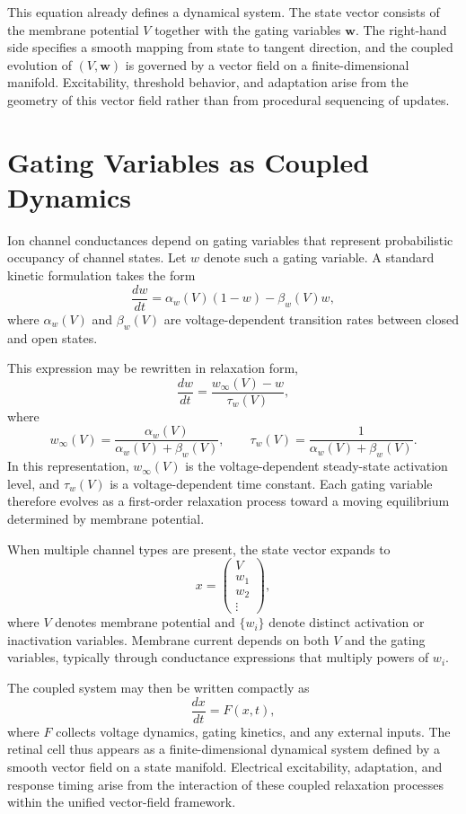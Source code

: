 \documentclass[12pt]{book}
\begin{document}
This equation already defines a dynamical system. The state vector
consists of the membrane potential $V$ together with the gating
variables $\mathbf{w}$. The right-hand side specifies a smooth
mapping from state to tangent direction, and the coupled evolution
of $(V,\mathbf{w})$ is governed by a vector field on a
finite-dimensional manifold. Excitability, threshold behavior,
and adaptation arise from the geometry of this vector field rather
than from procedural sequencing of updates.

\section{Gating Variables as Coupled Dynamics}

Ion channel conductances depend on gating variables that represent
probabilistic occupancy of channel states. Let $w$ denote such a gating
variable. A standard kinetic formulation takes the form
\[
\frac{dw}{dt}
=
\alpha_w(V)(1 - w)
-
\beta_w(V) w,
\]
where $\alpha_w(V)$ and $\beta_w(V)$ are voltage-dependent transition
rates between closed and open states.

This expression may be rewritten in relaxation form,
\[
\frac{dw}{dt}
=
\frac{w_\infty(V) - w}{\tau_w(V)},
\]
where
\[
w_\infty(V)
=
\frac{\alpha_w(V)}{\alpha_w(V) + \beta_w(V)},
\qquad
\tau_w(V)
=
\frac{1}{\alpha_w(V) + \beta_w(V)}.
\]
In this representation, $w_\infty(V)$ is the voltage-dependent
steady-state activation level, and $\tau_w(V)$ is a voltage-dependent
time constant. Each gating variable therefore evolves as a first-order
relaxation process toward a moving equilibrium determined by membrane
potential.

When multiple channel types are present, the state vector expands to
\[
x =
\begin{pmatrix}
V \\
w_1 \\
w_2 \\
\vdots
\end{pmatrix},
\]
where $V$ denotes membrane potential and $\{w_i\}$ denote distinct
activation or inactivation variables. Membrane current depends on both
$V$ and the gating variables, typically through conductance expressions
that multiply powers of $w_i$.

The coupled system may then be written compactly as
\[
\frac{dx}{dt} = F(x,t),
\]
where $F$ collects voltage dynamics, gating kinetics, and any external
inputs. The retinal cell thus appears as a finite-dimensional dynamical
system defined by a smooth vector field on a state manifold. Electrical
excitability, adaptation, and response timing arise from the interaction
of these coupled relaxation processes within the unified vector-field
framework.
\end{document}
